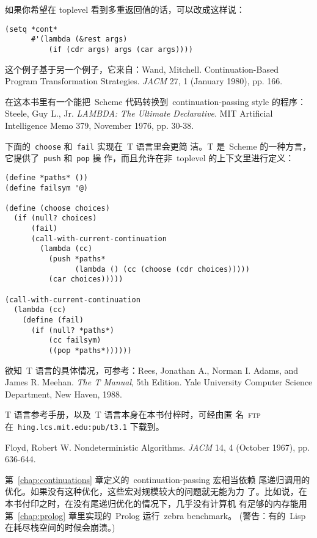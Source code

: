 \begin{notes}
  如果你希望在 toplevel 看到多重返回值的话，可以改成这样说：
\begin{verbatim}
(setq *cont*
      #'(lambda (&rest args)
          (if (cdr args) args (car args))))
\end{verbatim}

  这个例子基于另一个例子，它来自：Wand, Mitchell.
  Continuation-Based Program Transformation Strategies. \emph{JACM} 27, 1
  (January 1980), pp. 166.


  在这本书里有一个能把~Scheme 代码转换到~continuation-passing style 的程序：
  Steele, Guy L., Jr. \emph{\textsc{LAMBDA}: The Ultimate
  Declarative}. MIT Artificial Intelligence Memo 379, November 1976,
  pp. 30-38.  

  下面的~\texttt{choose} 和~\texttt{fail} 实现在~T 语言里会更简
  洁。T 是~Scheme 的一种方言，它提供了~\texttt{push} 和~\texttt{pop} 操
  作，而且允许在非~toplevel 的上下文里进行定义：

\begin{verbatim}
(define *paths* ())
(define failsym '@)

(define (choose choices)
  (if (null? choices)
      (fail)
      (call-with-current-continuation
        (lambda (cc)
          (push *paths*
                (lambda () (cc (choose (cdr choices)))))
          (car choices)))))

(call-with-current-continuation
  (lambda (cc)
    (define (fail)
      (if (null? *paths*)
          (cc failsym)
          ((pop *paths*))))))
\end{verbatim}
\label{note:func:choice-implemented-in-t}
  欲知~T 语言的具体情况，可参考：Rees, Jonathan A., Norman
  I. Adams, and James R.  Meehan.  \emph{The
    T Manual}, 5th Edition. Yale University Computer Science
  Department, New Haven, 1988.

  T 语言参考手册，以及~T 语言本身在本书付梓时，可经由匿
  名~\textsc{ftp} 在~\texttt{hing.lcs.mit.edu:pub/t3.1} 下载到。

  Floyd, Robert W. Nondeterministic
  Algorithms. \emph{JACM} 14, 4 (October 1967), pp. 636-644.  


  第~\ref{chap:continuations} 章定义的~continuation-passing 宏相当依赖
  尾递归调用的优化。如果没有这种优化，这些宏对规模较大的问题就无能为力
  了。比如说，在本书付印之时，在没有尾递归优化的情况下，几乎没有计算机
  有足够的内存能用第~\ref{chap:prolog} 章里实现的~Prolog 运行~zebra
  benchmark。 (警告：有的~Lisp 在耗尽栈空间的时候会崩溃。)
  

\end{notes}
